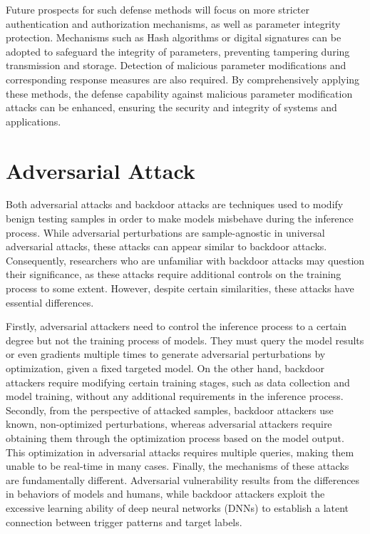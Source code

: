 \documentclass[pdflatex,sn-mathphys-num]{sn-jnl}%
\theoremstyle{thmstyleone}%
\theoremstyle{thmstyletwo}%
\theoremstyle{thmstylethree}%
\begin{document}
Future prospects for such defense methods will
focus on more stricter authentication and authorization
mechanisms, as well as parameter integrity protection.
Mechanisms such as Hash algorithms or digital signatures
can be adopted to safeguard the integrity of parameters,
preventing tampering during transmission and storage.
Detection of malicious parameter modifications and
corresponding response measures are also required.
By comprehensively applying these methods, the defense capability
against malicious parameter modification attacks can be
enhanced, ensuring the security and integrity of systems
and applications.


\section{Adversarial Attack}
Both adversarial attacks and backdoor attacks are
techniques used to modify benign testing samples in order
to make models misbehave during the inference process.
While adversarial perturbations are sample-agnostic in
universal adversarial attacks, these attacks can appear
similar to backdoor attacks. Consequently, researchers
who are unfamiliar with backdoor attacks may question
their significance, as these attacks require additional
controls on the training process to some extent. However,
despite certain similarities, these attacks have essential
differences.

Firstly, adversarial attackers need to control the
inference process to a certain degree but not the training
process of models. They must query the model results
or even gradients multiple times to generate adversarial
perturbations by optimization, given a fixed targeted
model. On the other hand, backdoor attackers require
modifying certain training stages, such as data collection
and model training, without any additional requirements
in the inference process. Secondly, from the perspective
of attacked samples, backdoor attackers use known,
non-optimized perturbations, whereas adversarial attackers
require obtaining them through the optimization process
based on the model output. This optimization in
adversarial attacks requires multiple queries, making them unable
to be real-time in many cases. Finally, the mechanisms
of these attacks are fundamentally different. Adversarial
vulnerability results from the differences in behaviors of
models and humans, while backdoor attackers exploit the
excessive learning ability of deep neural networks (DNNs)
to establish a latent connection between trigger patterns
and target labels.
\end{document}
